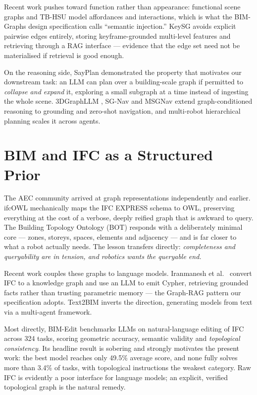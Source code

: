 \documentclass[10pt,twocolumn,letterpaper]{article}
\begin{document}
Recent work pushes toward function rather than appearance: functional scene
graphs \cite{hu2026functional} and TB-HSU \cite{xu2024tbhsu} model affordances
and interactions, which is what the BIM-Graphs design specification calls
``semantic injection.'' KeySG \cite{werby2025keysg} avoids explicit pairwise
edges entirely, storing keyframe-grounded multi-level features and retrieving
through a RAG interface --- evidence that the edge set need not be materialised
if retrieval is good enough.

On the reasoning side, SayPlan \cite{rana2023sayplan} demonstrated the property
that motivates our downstream task: an LLM can plan over a building-scale graph
if permitted to \emph{collapse and expand} it, exploring a small subgraph at a
time instead of ingesting the whole scene. 3DGraphLLM
\cite{zemskova20243dgraphllm}, SG-Nav \cite{yin2024sgnav} and MSGNav
\cite{huang2025msgnav} extend graph-conditioned reasoning to grounding and
zero-shot navigation, and multi-robot hierarchical planning
\cite{strader2025multirobot} scales it across agents.

\section{BIM and IFC as a Structured Prior}
\label{sec:bim}

The AEC community arrived at graph representations independently and earlier.
ifcOWL \cite{pauwels2016ifcowl} mechanically maps the IFC EXPRESS schema to OWL,
preserving everything at the cost of a verbose, deeply reified graph that is
awkward to query. The Building Topology Ontology (BOT)
\cite{rasmussen2021bot} responds with a deliberately minimal core --- zones,
storeys, spaces, elements and adjacency --- and is far closer to what a robot
actually needs. The lesson transfers directly: \emph{completeness and
queryability are in tension, and robotics wants the queryable end.}

Recent work couples these graphs to language models. Iranmanesh et al.\
\cite{iranmanesh2025graphrag} convert IFC to a knowledge graph and use an LLM to
emit Cypher, retrieving grounded facts rather than trusting parametric memory ---
the Graph-RAG pattern our specification adopts. Text2BIM \cite{du2024text2bim}
inverts the direction, generating models from text via a multi-agent framework.

Most directly, BIM-Edit \cite{nithyanantham2026bimedit} benchmarks LLMs on
natural-language editing of IFC across 324 tasks, scoring geometric accuracy,
semantic validity and \emph{topological consistency}. Its headline result is
sobering and strongly motivates the present work: the best model reaches only
49.5\% average score, and none fully solves more than 3.4\% of tasks, with
topological instructions the weakest category. Raw IFC is evidently a poor
interface for language models; an explicit, verified topological graph is the
natural remedy.
\end{document}
